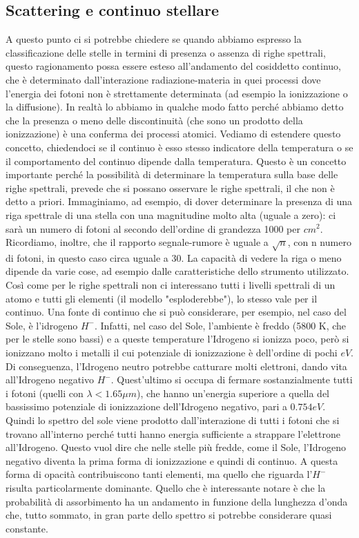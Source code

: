 \documentclass[a4paper,11pt]{article}
\begin{document}
\subsection{Scattering e continuo stellare}
A questo punto ci si potrebbe chiedere se quando abbiamo espresso la classificazione delle stelle in termini di presenza o assenza di righe spettrali, questo ragionamento possa essere esteso all'andamento del cosiddetto continuo, che è determinato dall'interazione radiazione-materia in quei processi dove l'energia dei fotoni non è strettamente determinata (ad esempio la ionizzazione o la diffusione). In realtà lo abbiamo in qualche modo fatto perché abbiamo detto che la presenza o meno delle discontinuità (che sono un prodotto della ionizzazione) è una conferma dei processi atomici. Vediamo di estendere questo concetto, chiedendoci se il continuo è esso stesso indicatore della temperatura o se il comportamento del continuo dipende dalla temperatura. Questo è un concetto importante perché la possibilità di determinare la temperatura sulla base delle righe spettrali, prevede che si possano osservare le righe spettrali, il che non è detto a priori. Immaginiamo, ad esempio, di dover determinare la presenza di una riga spettrale di una stella con una magnitudine molto alta (uguale a zero): ci sarà un numero di fotoni al secondo dell'ordine di grandezza 1000 per \(cm^2\). Ricordiamo, inoltre, che il rapporto segnale-rumore è uguale a \(\sqrt{n}\), con n numero di fotoni, in questo caso circa uguale a 30. La capacità di vedere la riga o meno dipende da varie cose, ad esempio dalle caratteristiche dello strumento utilizzato. \\ Così come per le righe spettrali non ci interessano tutti i livelli spettrali di un atomo e tutti gli elementi (il modello "esploderebbe"), lo stesso vale per il continuo. Una fonte di continuo che si può considerare, per esempio, nel caso del Sole, è l'idrogeno \(H^-\). Infatti, nel caso del Sole, l'ambiente è freddo (5800 K, che per le stelle sono bassi) e a queste temperature l'Idrogeno si ionizza poco, però si ionizzano molto i metalli il cui potenziale di ionizzazione è dell'ordine di pochi \(eV\). Di conseguenza, l'Idrogeno neutro potrebbe catturare molti elettroni, dando vita all'Idrogeno negativo \(H^-\). Quest'ultimo si occupa di fermare sostanzialmente tutti i fotoni (quelli con \(\lambda < 1.65 \mu m\)), che hanno un'energia superiore a quella del bassissimo potenziale di ionizzazione dell'Idrogeno negativo, pari a \(0.754 eV\). Quindi lo spettro del sole viene prodotto dall'interazione di tutti i fotoni che si trovano all'interno perché tutti hanno energia sufficiente a strappare l'elettrone all'Idrogeno. Questo vuol dire che nelle stelle più fredde, come il Sole, l'Idrogeno negativo diventa la prima forma di ionizzazione  e quindi di continuo. A questa forma di opacità contribuiscono tanti elementi, ma quello che riguarda l'\(H^-\) risulta particolarmente dominante. Quello che è interessante notare è che la probabilità di assorbimento ha un andamento in funzione della lunghezza d'onda che, tutto sommato, in gran parte dello spettro si potrebbe considerare quasi constante.
\end{document}
